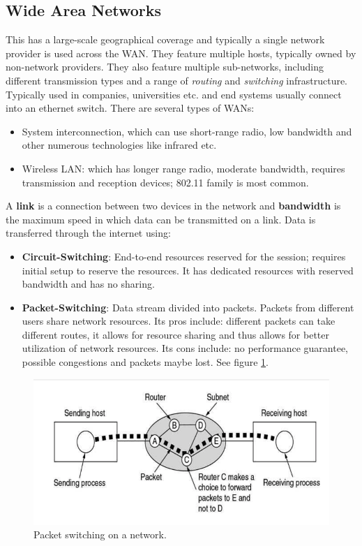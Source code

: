 \documentclass[twoside]{article}
\begin{document}
\subsection{Wide Area Networks}
This has a large-scale geographical coverage and typically a single network
provider is used across the WAN. They feature multiple hosts, typically owned
by non-network providers. They also feature multiple sub-networks, including
different transmission types and a range of \emph{routing} and \emph{switching}
infrastructure. Typically used in companies, universities etc. and end systems
usually connect into an ethernet switch. There are several types of WANs:
\begin{itemize}
    \item System interconnection, which can use short-range radio, low bandwidth
    and other numerous technologies like infrared etc.
    \item Wireless LAN: which has longer range radio, moderate bandwidth,
    requires transmission and reception devices; 802.11 family is most common.
\end{itemize}
A \textbf{link} is a connection between two devices in the network and 
\textbf{bandwidth} is the maximum speed in which data can be transmitted on
a link. Data is transferred through the internet using:
\begin{itemize}
    \item \textbf{Circuit-Switching}: End-to-end resources reserved for the 
    session; requires initial setup to reserve the resources. It has 
    dedicated resources with reserved bandwidth and has no sharing.
    \item \textbf{Packet-Switching}: Data stream divided into packets. Packets
    from different users share network resources. Its pros include: different
    packets can take different routes, it allows for resource sharing and thus
    allows for better utilization of network resources. Its cons include: no
    performance guarantee, possible congestions and packets maybe lost. See 
    figure \ref{fig:packet-switch}.
\end{itemize}
\begin{figure}
  \includegraphics[width=\linewidth]{packet-switch.png}
  \caption{Packet switching on a network.}
  \label{fig:packet-switch}
\end{figure}
\end{document}

